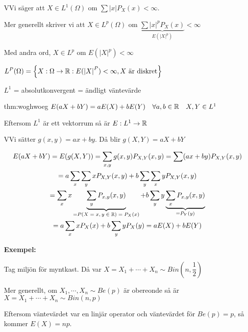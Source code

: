 \par\bigskip
\begin{theo}
  VVi säger att $X\in L^1(\Omega)$ om $\sum\left|x\right|P_X(x)<\infty$.\par
  \noindent Mer generellt skriver vi att $X\in L^p(\Omega)$ om $\underbrace{\sum\left|x\right|^pP_X(x)}_{\text{$E(\left|X\right|^p)$}}<\infty$\par
  \noindent Med andra ord, $X\in L^p$ om $E(\left|X\right|^p)<\infty$
  \par\bigskip
  \noindent $L^P(\Omega) = \left\{X:\Omega\to\mathbb{R}:E(\left|X\right|^P)<\infty, X\text{ är diskret}\right\}$\par
  \noindent $L^1$ = absolutkonvergent = ändligt väntevärde
\end{theo}
\par\bigskip
\begin{theo}{thm:woghwoeg}
  $E(aX+bY) = aE(X)+bE(Y)\quad\forall a,b\in\mathbb{R}\quad X,Y\in L^1$
  \par\bigskip
  \noindent Eftersom $L^1$ är ett vektorrum så är $E:L^1\to\mathbb{R}$
\end{theo}
\newpage
\begin{prf}
  VVi sätter $g(x,y) = ax+by$. Då blir $g(X,Y) = aX+bY$\par
  \begin{equation*}
    \begin{gathered}
      E(aX+bY) = E(g(X,Y)) = \sum_{x,y} g(x,y)P_{X,Y}(x,y) = \sum (ax+by)P_{X,Y}(x,y)\\
      = a\sum_x\sum_y xP_{X,Y}(x,y)+b\sum_y\sum_x yP_{X,Y}(x,y)\\
      = \sum_x x\underbrace{\sum_y P_{x,y}(x,y)}_{\text{=$P(X=x,y\in\mathbb{R})=P_X(x)$}}+b\sum_y y\underbrace{\sum_x P_{x,y}(x,y)}_{\text{=$P_Y(y)$}}\\
      = a\sum_x xP_X(x)+b\sum_y yP_X(y) = aE(X)+bE(Y)
    \end{gathered}
  \end{equation*}
\end{prf}
\par\bigskip
\noindent\textbf{Exempel:}\par
\noindent Tag miljön för myntkast. Då var $X = X_1+\cdots+X_n\sim Bin(n,\dfrac{1}{2})$
\par\bigskip
\noindent Mer generellt, om $X_1,\cdots, X_n\sim Be(p)$ är obereonde så är $X=X_1+\cdots+X_n\sim Bin(n,p)$\par
\noindent Eftersom väntevärdet var en linjär operator och väntevärdet för $Be(p)=p$, så kommer $E(X) = np$.
